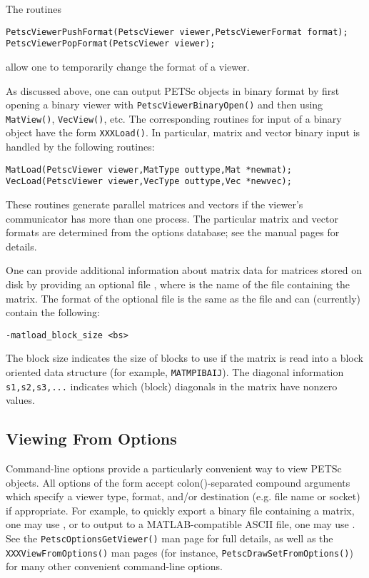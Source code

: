 {{The routines
\begin{lstlisting}
PetscViewerPushFormat(PetscViewer viewer,PetscViewerFormat format);
PetscViewerPopFormat(PetscViewer viewer);
\end{lstlisting}
allow one to temporarily change the format of a viewer.

As discussed above, one can output PETSc objects in binary format by
first opening a binary viewer with \lstinline{PetscViewerBinaryOpen()} and
then using \lstinline{MatView()}, \lstinline{VecView()}, etc.  The corresponding
routines for input of a binary object have the form \lstinline{XXXLoad()}.  In
particular, matrix and vector binary input is handled by the
following routines:
\begin{lstlisting}
MatLoad(PetscViewer viewer,MatType outtype,Mat *newmat);
VecLoad(PetscViewer viewer,VecType outtype,Vec *newvec);
\end{lstlisting}
These routines generate parallel matrices and vectors if the viewer's
communicator has more than one process.  The particular matrix and
vector formats are determined from the options database; see the
manual pages for details.

One can provide additional information about matrix data for matrices
stored on disk by providing an optional file ,
where  is the name of the file containing the matrix.
The format of the optional file is the same as the  file
and can (currently) contain the following:
\begin{lstlisting}
-matload_block_size <bs>
\end{lstlisting}
The block size indicates the size of blocks to use if the matrix is
read into a block oriented data structure (for example,
\lstinline{MATMPIBAIJ}). The diagonal information
\lstinline{s1,s2,s3,...} indicates
which (block) diagonals in the matrix have nonzero values.

\subsection{Viewing From Options}
\label{sec_viewfromoptions}
Command-line options provide a particularly convenient way to view PETSc objects.
All options of the form  accept colon(\trl{:})-separated compound arguments which
specify a viewer type, format, and/or destination (e.g. file name or socket) if appropriate.
For example, to quickly export a binary file containing a matrix, one may use
, 
or to output to a MATLAB-compatible ASCII file, one may use
.
See the \lstinline{PetscOptionsGetViewer()} man page for full details,
as well as the \lstinline{XXXViewFromOptions()} man pages (for instance, \lstinline{PetscDrawSetFromOptions()})
for many other convenient command-line options.

}}
